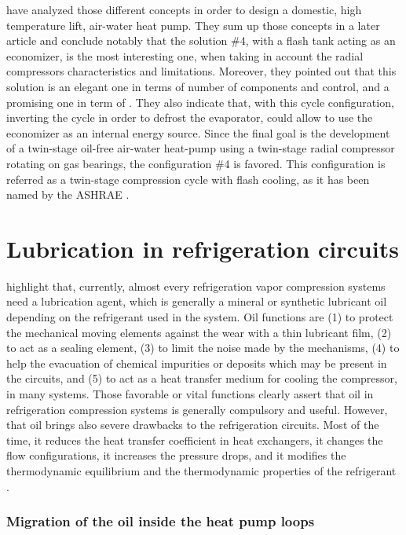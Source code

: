 \citet{Schiffmann-Favrat-2005a} have analyzed those different concepts
in order to design a domestic, high temperature lift, air-water heat
pump. They sum up those concepts in a later article
\citep{Schiffmann-Favrat-2009a} and conclude notably that the solution
\#4, with a flash tank acting as an economizer, is the most
interesting one, when taking in account the radial compressors
characteristics and limitations. Moreover, they pointed out that this
solution is an elegant one in terms of number of components and
control, and a promising one in term of \COP{}
\citep{schiffmann-2008a,Favrat-Courtin-1997a}. They also indicate
that, with this cycle configuration, inverting the cycle in order to
defrost the evaporator, could allow to use the economizer as an
internal energy source. Since the final goal is the development of a
twin-stage oil-free air-water heat-pump using a twin-stage radial
compressor rotating on gas bearings, the configuration \#4 is
favored. This configuration is referred as a twin-stage compression
cycle with flash cooling, as it has been named by the ASHRAE
\citep[Fig.\,49, p.\,37.29]{ASHRAE-HVACeq-2008a-Compressor}.

\section{Lubrication in refrigeration circuits}

\citet{YoubiIdrissi-Bonjour-2008a} highlight that, currently, almost
every refrigeration vapor compression systems need a lubrication
agent, which is generally a mineral or synthetic lubricant oil
depending on the refrigerant used in the system. Oil functions are (1)
to protect the mechanical moving elements against the wear with a thin
lubricant film, (2) to act as a sealing element, (3) to limit the
noise made by the mechanisms, (4) to help the evacuation of chemical
impurities or deposits which may be present in the circuits, and (5)
to act as a heat transfer medium for cooling the compressor, in many
systems. Those favorable or vital functions clearly assert that oil in
refrigeration compression systems is generally compulsory and
useful. However, that oil brings also severe drawbacks to the
refrigeration circuits. Most of the time, it reduces the heat transfer
coefficient in heat exchangers, it changes the flow configurations, it
increases the pressure drops, and it modifies the thermodynamic
equilibrium and the thermodynamic properties of the refrigerant
\citep{YoubiIdrissi-Bonjour-2008a}.

\subsubsection{Migration of the oil inside the heat pump loops}
\label{sec:migration}

